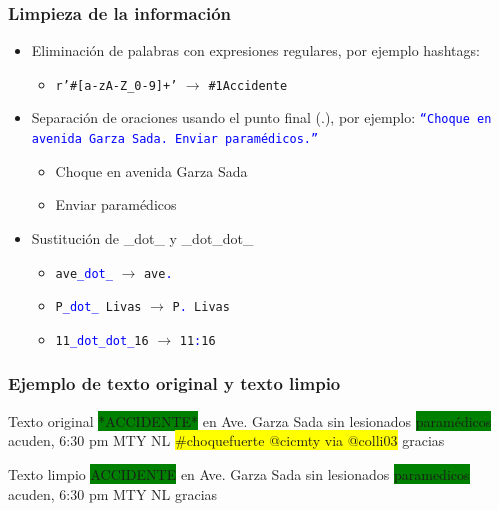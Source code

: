 \documentclass{beamer}
\begin{document}
\begin{frame}
  \frametitle{Limpieza de la informaci\'{o}n}
  \begin{itemize}
  \item Eliminaci\'{o}n de palabras con expresiones regulares, por ejemplo hashtags:
    \begin{itemize}
    \item \texttt{r'\#[a-zA-Z\_0-9]+'} $\rightarrow$ \texttt{\#1Accidente}
    \end{itemize}
    \vspace{2 mm}

  \item Separaci\'{o}n de oraciones usando el punto final (.), por ejemplo: \textcolor{blue}{\texttt{``Choque en avenida Garza Sada. Enviar param\'{e}dicos.''}}
    \begin{itemize}
    \item Choque en avenida Garza Sada
    \item Enviar param\'{e}dicos
    \end{itemize}
    \vspace{2 mm}

  \item Sustituci\'{o}n de \_dot\_ y \_dot\_dot\_
    \begin{itemize}
    \item \texttt{ave\textcolor{blue}{\_dot\_}} $\rightarrow$ \texttt{ave\textcolor{blue}{.}} 
    \item  \texttt{P\textcolor{blue}{\_dot\_} Livas} $\rightarrow$ \texttt{P\textcolor{blue}{.} Livas}
    \item  \texttt{11\textcolor{blue}{\_dot\_dot\_}16} $\rightarrow$ \texttt{11\textcolor{blue}{:}16}
    \end{itemize}
    
  \end{itemize}
\end{frame}


\begin{frame}
 \frametitle{Ejemplo de texto original y texto limpio}
  
  \begin{block}{Texto original}
    \colorbox{green}{*ACCIDENTE*} en Ave. Garza Sada sin lesionados \colorbox{green}{param\'{e}dicos} acuden, 6:30 pm MTY NL \colorbox{yellow}{\#choquefuerte @cicmty via @colli03} gracias
  \end{block}
  
  \vspace{5 mm}
  
  \begin{block}{Texto limpio}
    \colorbox{green}{ACCIDENTE} en Ave. Garza Sada sin lesionados \colorbox{green}{paramedicos} acuden, 6:30 pm MTY NL gracias
  \end{block} 

\end{frame}
\end{document}
